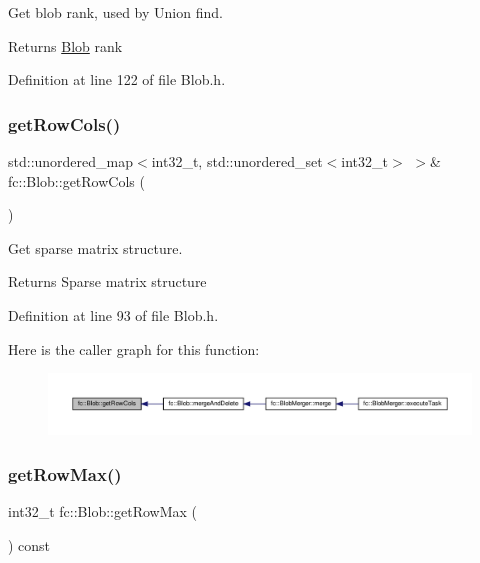 Get blob rank, used by Union find. 

\begin{DoxyReturn}{Returns}
\hyperlink{classfc_1_1Blob}{Blob} rank 
\end{DoxyReturn}


Definition at line 122 of file Blob.\+h.

\mbox{\label{classfc_1_1Blob_a80e63b761ebffdf90dea47b8a59b2c32}} 
\subsubsection{\texorpdfstring{get\+Row\+Cols()}{getRowCols()}}
{\footnotesize\ttfamily std\+::unordered\+\_\+map$<$int32\+\_\+t, std\+::unordered\+\_\+set$<$int32\+\_\+t$>$ $>$\& fc\+::\+Blob\+::get\+Row\+Cols (\begin{DoxyParamCaption}{ }\end{DoxyParamCaption})\hspace{0.3cm}{\ttfamily [inline]}}



Get sparse matrix structure. 

\begin{DoxyReturn}{Returns}
Sparse matrix structure 
\end{DoxyReturn}


Definition at line 93 of file Blob.\+h.

Here is the caller graph for this function\+:
\nopagebreak
\begin{figure}[H]
\begin{center}
\leavevmode
\includegraphics[width=350pt]{d2/d7e/classfc_1_1Blob_a80e63b761ebffdf90dea47b8a59b2c32_icgraph}
\end{center}
\end{figure}
\mbox{\label{classfc_1_1Blob_af4a030b9ba08fd02242137a296a3692b}} 
\subsubsection{\texorpdfstring{get\+Row\+Max()}{getRowMax()}}
{\footnotesize\ttfamily int32\+\_\+t fc\+::\+Blob\+::get\+Row\+Max (\begin{DoxyParamCaption}{ }\end{DoxyParamCaption}) const\hspace{0.3cm}{\ttfamily [inline]}}




